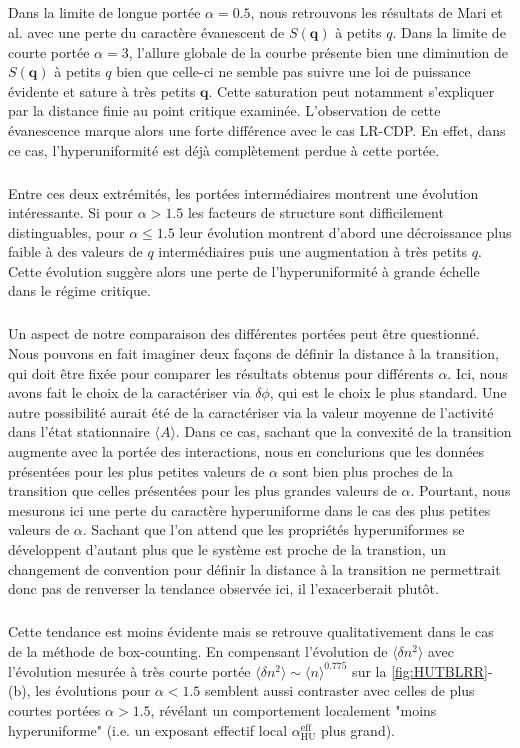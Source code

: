 \subparagraph{}Dans la limite de longue portée $\alpha = 0.5$, nous retrouvons les résultats de Mari et al. \cite{mari_absorbing_2022} avec une perte du caractère évanescent de $S(\mathbf{q})$ à petits $q$. Dans la limite de courte portée $\alpha = 3$, l'allure globale de la courbe présente bien une diminution de $S(\mathbf{q})$ à petits $q$ bien que celle-ci ne semble pas suivre une loi de puissance évidente et sature à très petits $\mathbf{q}$. Cette saturation peut notamment s'expliquer par la distance finie au point critique examinée. L'observation de cette évanescence marque alors une forte différence avec le cas LR-CDP. En effet, dans ce cas, l'hyperuniformité est déjà complètement perdue à cette portée.  

\subparagraph{}Entre ces deux extrémités, les portées intermédiaires montrent une évolution intéressante. Si pour $\alpha > 1.5$ les facteurs de structure sont difficilement distinguables, pour $\alpha \leq 1.5$ leur évolution montrent d'abord une décroissance plus faible à des valeurs de $q$ intermédiaires puis une augmentation à très petits $q$. Cette évolution suggère alors une perte de l'hyperuniformité à grande échelle dans le régime critique.

\subparagraph{}Un aspect de notre comparaison des différentes portées peut être questionné. Nous pouvons en fait imaginer deux façons de définir la distance à la transition, qui doit être fixée pour comparer les résultats obtenus pour différents $\alpha$. Ici, nous avons fait le choix de la caractériser via $\delta\phi$, qui est le choix le plus standard. Une autre possibilité aurait été de la caractériser via la valeur moyenne de l'activité dans l'état stationnaire $\langle A \rangle$. Dans ce cas, sachant que la convexité de la transition augmente avec la portée des interactions, nous en conclurions que les données présentées pour les plus petites valeurs de $\alpha$ sont bien plus proches de la transition que celles présentées pour les  plus grandes valeurs de $\alpha$. Pourtant, nous mesurons ici une perte du caractère hyperuniforme dans le cas des plus petites valeurs de $\alpha$. Sachant que l'on attend que les propriétés hyperuniformes se développent d'autant plus que le système est proche de la transtion, un changement de convention pour définir la distance à la transition ne permettrait donc pas de renverser la tendance observée ici, il l'exacerberait plutôt.

\subparagraph{}Cette tendance est moins évidente  mais se retrouve qualitativement dans le cas de la méthode de box-counting. En compensant l'évolution de $\langle \delta n^2 \rangle$ avec l'évolution mesurée à très courte portée $\langle \delta n^2 \rangle \sim \langle n \rangle^{0.775}$ sur la \autoref{fig:HUTBLRR}-(b), les évolutions pour $\alpha<1.5$ semblent aussi contraster avec celles de plus courtes portées $\alpha>1.5$, révélant un comportement localement "moins hyperuniforme" (i.e. un exposant effectif local $\alpha_\text{HU}^\text{eff}$ plus grand).

